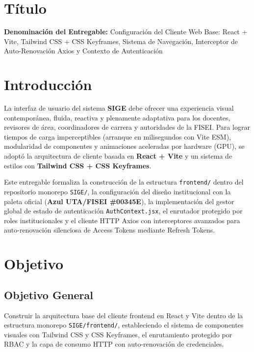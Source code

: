 \documentclass[12pt,a4paper]{article}
\begin{document}
\section{Título}
\textbf{Denominación del Entregable:} Configuración del Cliente Web Base: React + Vite, Tailwind CSS + CSS Keyframes, Sistema de Navegación, Interceptor de Auto-Renovación Axios y Contexto de Autenticación



\section{Introducción}
La interfaz de usuario del sistema \textbf{SIGE} debe ofrecer una experiencia visual contemporánea, fluida, reactiva y plenamente adaptativa para los docentes, revisores de área, coordinadores de carrera y autoridades de la FISEI. Para lograr tiempos de carga imperceptibles (arranque en milisegundos con Vite ESM), modularidad de componentes y animaciones aceleradas por hardware (GPU), se adoptó la arquitectura de cliente basada en \textbf{React + Vite} y un sistema de estilos con \textbf{Tailwind CSS + CSS Keyframes}.

Este entregable formaliza la construcción de la estructura \texttt{frontend/} dentro del repositorio monorepo \texttt{SIGE/}, la configuración del diseño institucional con la paleta oficial (\textbf{Azul UTA/FISEI \#00345E}), la implementación del gestor global de estado de autenticación \texttt{AuthContext.jsx}, el enrutador protegido por roles institucionales y el cliente HTTP Axios con interceptores avanzados para auto-renovación silenciosa de Access Tokens mediante Refresh Tokens.

\section{Objetivo}

\subsection{Objetivo General}
Construir la arquitectura base del cliente frontend en React y Vite dentro de la estructura monorepo \texttt{SIGE/frontend/}, estableciendo el sistema de componentes visuales con Tailwind CSS y CSS Keyframes, el enrutamiento protegido por RBAC y la capa de consumo HTTP con auto-renovación de credenciales.
\end{document}
